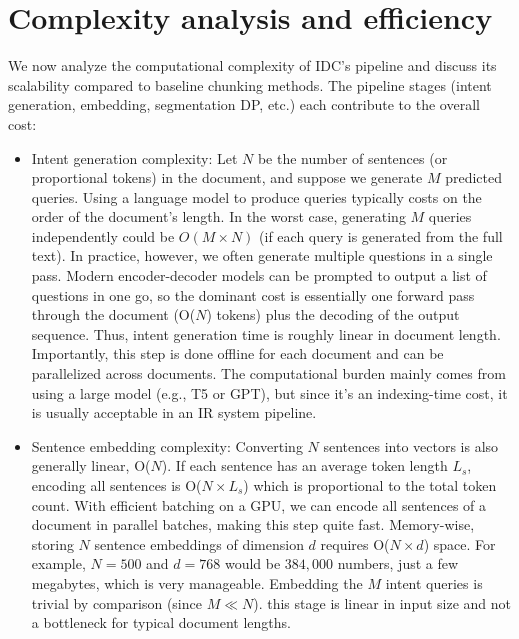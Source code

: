 \documentclass[12pt,a4paper]{report}
\begin{document}
\section{Complexity analysis and efficiency}

We now analyze the computational complexity of IDC's pipeline and discuss its scalability compared to baseline chunking methods. The pipeline stages (intent generation, embedding, segmentation DP, etc.) each contribute to the overall cost:

\begin{itemize}
\item Intent generation complexity: Let $N$ be the number of sentences (or proportional tokens) in the document, and suppose we generate $M$ predicted queries. Using a language model to produce queries typically costs on the order of the document's length. In the worst case, generating $M$ queries independently could be $O(M \times N)$ (if each query is generated from the full text). In practice, however, we often generate multiple questions in a single pass. Modern encoder-decoder models can be prompted to output a list of questions in one go, so the dominant cost is essentially one forward pass through the document (O($N$) tokens) plus the decoding of the output sequence. Thus, intent generation time is roughly linear in document length. Importantly, this step is done offline for each document and can be parallelized across documents. The computational burden mainly comes from using a large model (e.g., T5 or GPT), but since it's an indexing-time cost, it is usually acceptable in an IR system pipeline.

\item Sentence embedding complexity: Converting $N$ sentences into vectors is also generally linear, O($N$). If each sentence has an average token length $L_s$, encoding all sentences is O($N \times L_s$) which is proportional to the total token count. With efficient batching on a GPU, we can encode all sentences of a document in parallel batches, making this step quite fast. Memory-wise, storing $N$ sentence embeddings of dimension $d$ requires O($N \times d$) space. For example, $N=500$ and $d=768$ would be $384,000$ numbers, just a few megabytes, which is very manageable. Embedding the $M$ intent queries is trivial by comparison (since $M \ll N$). this stage is linear in input size and not a bottleneck for typical document lengths.


\end{itemize}
\end{document}
